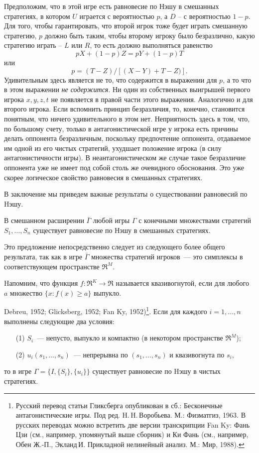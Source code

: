 \documentclass[12pt]{article}
\begin{document}
{Предположим, что в этой игре есть равновесие по Нэшу в смешанных
стратегиях, в котором $U$ играется с вероятностью $p$, а $D$ --
с вероятностью $1-p$. Для того, чтобы гарантировать, что второй
игрок тоже будет играть смешанную стратегию, $p$ должно быть таким,
чтобы второму игроку было безразлично, какую стратегию играть --
$L$ или $R$, то есть должно выполняться равенство
$$pX+(1-p)Z=pY+(1-p)T$$
или
$$p=(T-Z)/[(X-Y)+T-Z)].$$
Удивительным здесь является не то, что содержится в выражении для
$p$, а то что в этом выражении \emph{не содержится}. Ни один из
собственных выигрышей первого игрока $x, y, z, t$ не появляется
в правой части этого выражения. Аналогично и для второго игрока.
Если вспомнить принцип безразличия, то, конечно, становится понятным,
что ничего удивительного в этом нет. Неприятность здесь в том, что,
по большому счету, только в антагонистической игре у игрока есть
причины делать оппонента безразличным, поскольку предпочтение
оппонента, отдаваемое им одной из его чистых стратегий, ухудшает
положение игрока (в силу антагонистичности игры). В неантагонистическом
же случае такое безразличие оппонента уже не имеет под собой столь же
очевидного обоснования. Это уже скорее логическое свойство
равновесия в смешанных стратегиях.

В заключение мы приведем важные результаты о существовании
равновесий по Hэшу.

\begin{proposition}
В смешанном расширении $\bar\Gamma$ любой игры $\Gamma$ с конечными
множествами стратегий $S_1,\ldots,S_n$ существует равновесие по Нэшу
в смешанных стратегиях.
\end{proposition}

Это предложение непосредственно следует из следующего более общего
результата, так как в игре $\bar\Gamma$ множества стратегий
игроков~--- это симплексы в соответствующем пространстве $\Re^M$.

Hапомним, что функция $f:\Re^K\to\Re$ называется квазивогнутой, если
для любого $a$ множество $\{x:f(x)\ge a\}$ выпукло.

\begin{theorem}
{\rm Debreu, 1952; Glicksberg, 1952; Fan Ky, 1952)}\footnote{
Русский перевод статьи Гликсберга опубликован в сб.: Бесконечные
антагонистические игры. Под ред. H.\,H.\,Воробьева. М.: Физматгиз,
1963. В русских переводах можно встретить две версии транскрипции
Fan Ky: Фань Цзи (см., например, упомянутый выше сборник) и Ки Фань
(см., например, Обен Ж.-П., Экланд\,И. Прикладной нелинейный анализ.
М.: Мир, 1988).}. Если для каждого $i=1,\ldots,n$ выполнены следующие
два условия:
\begin{itemize}
\item[(1)] $S_i$~--- непусто, выпукло и компактно (в некотором
пространстве $\Re^M$);
\item[(2)] $u_i(s_1,\ldots,s_n)$~--- непрерывна по $(s_1,\ldots,s_n)$ и
квазивогнута по $s_i$, \end{itemize} то в игре
$\Gamma=\{I,\{S_i\},\{u_i\}\}$ существует равновесие по Hэшу в
чистых стратегиях.
\end{theorem}


}
\end{document}
